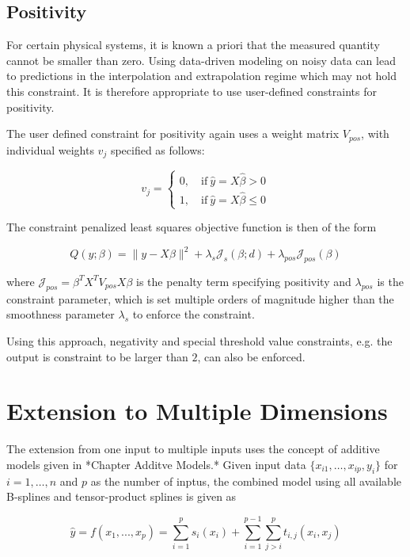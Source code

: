 \documentclass[10pt,a4paper]{article}
\begin{document}
	\subsection{Positivity}
	
	For certain physical systems, it is known a priori that the measured quantity cannot be smaller than zero. Using data-driven modeling on noisy data can lead to predictions in the interpolation and extrapolation regime which may not hold this constraint. It is therefore appropriate to use user-defined constraints for positivity.
	
	The user defined constraint for positivity again uses a weight matrix $V_{pos}$, with individual weights $v_j$ specified as follows:
	
	$$v_j = \begin{cases} 0, \quad \text{if} \ \hat y = X\hat \beta > 0\\ 1, \quad \text{if} \ \hat y = X \hat \beta \le 0 \end{cases}$$
	
	The constraint penalized least squares objective function is then of the form
	
	$$Q(y; \beta) = \lVert y - X\beta \rVert^2 + \lambda_s \mathcal J_s(\beta; d) + \lambda_{pos} \mathcal J_{pos}(\beta) $$
	
	where $\mathcal J_{pos} = \beta^T X^T V_{pos} X \beta$ is the penalty term specifying positivity and $\lambda_{pos}$ is the constraint parameter, which is set multiple orders of magnitude higher than the smoothness parameter $\lambda_s$ to enforce the constraint.
	
	Using this approach, negativity and special threshold value constraints, e.g. the output is constraint to be larger than $2$, can also be enforced.
	
	\section{Extension to Multiple Dimensions}
	
	The extension from one input to multiple inputs uses the concept of additive models given in *Chapter Additve Models.* Given input data $\{ x_{i1}, \dots, x_{ip}, y_i\}$ for $i = 1, \dots, n$ and $p$ as the number of inptus, the combined model using all available B-splines and tensor-product splines is given as
	
	$$\hat y = f(x_1,..., x_p) = \sum_{i=1}^p s_i(x_i) + \sum_{i=1}^{p-1} \sum_{j>i}^p t_{i,j}(x_i, x_j) $$
	
\end{document}
